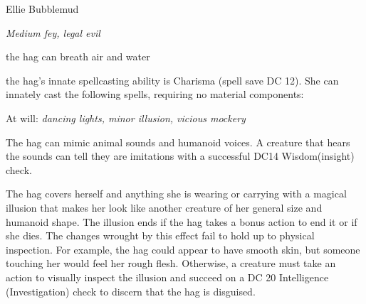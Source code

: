 \documentclass[10pt,twoside, twocolumn, openany]{dndbook}
\begin{document}
\begin{monsterbox}{Ellie Bubblemud}
  \begin{hangingpar}
    \textit{Medium fey, legal evil}
  \end{hangingpar}
  \dndline%
  \basics[%
  armorclass = 17,
  hitpoints  = \dice{11d8 + 33},
  speed      = {30 ft.},
  ]
  \dndline%
  \stats[
    STR = \stat{18},
    DEX = \stat{12},
    CON = \stat{16},
    INT = \stat{13},
    WIS = \stat{14},
    CHA = \stat{14},
  ]
  \dndline%
  \details[
    skills = {Arcana +3, Deception +4, Perception +4, Stealth +3},
    senses = {darkvision 60 ft., passive Perception 14},
    languages = {Common, Draconic, Sylvan},
    challenge = {3},
  ]
  \dndline%

  \begin{monsteraction}[Amphibious]
    the hag can breath air and water
  \end{monsteraction}

  \begin{monsteraction}
    the hag's innate spellcasting ability is Charisma (spell save DC 12). She can innately cast the following spells, requiring no material components:

    At will: \textit{dancing lights, minor illusion, vicious mockery}
  \end{monsteraction}

  \begin{monsteraction}[Mimicry]
    The hag can mimic animal sounds and humanoid voices. A creature that hears the sounds can tell they are imitations with a successful DC14 Wisdom(insight) check.
  \end{monsteraction}


  \monstermelee[
    name=Claws,
    mod=+6,
    reach=5,
    targets=one target,
    dmg=\dice{2d8+4},
    dmgtype=slashing,
  ]

  \begin{monsteraction}
    The hag covers herself and anything she is
wearing or carrying with a magical illusion that makes her look
like another creature of her general size and humanoid shape.
The illusion ends if the hag takes a bonus action to end it or
if she dies.
The changes wrought by this effect fail to hold up to physical
inspection. For example, the hag could appear to have smooth
skin, but someone touching her would feel her rough flesh.
Otherwise, a creature must take an action to visually inspect
the illusion and succeed on a DC 20 Intelligence (Investigation)
check to discern that the hag is disguised.
  \end{monsteraction}


\end{monsterbox}
\end{document}
